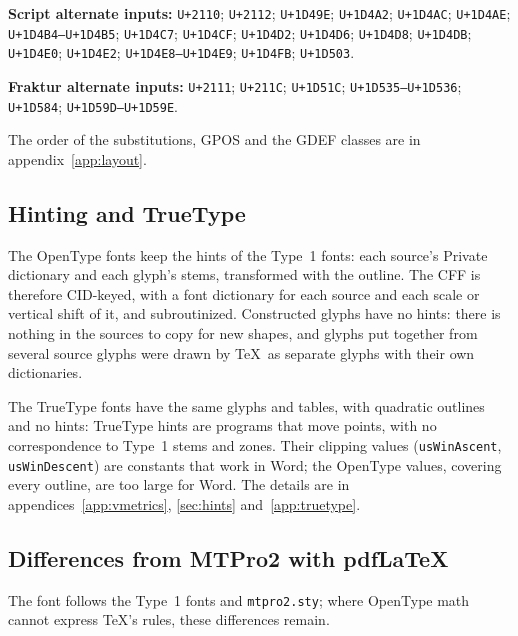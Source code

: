 \documentclass[10pt]{article}
\newcommand\file[1]{\texttt{#1}}
\newcommand\code[1]{\texttt{#1}}
\begin{document}
\begingroup\raggedright\textbf{Script alternate inputs:} \texttt{U+2110};
\texttt{U+2112}; \texttt{U+1D49E}; \texttt{U+1D4A2}; \texttt{U+1D4AC};
\texttt{U+1D4AE}; \texttt{U+1D4B4--U+1D4B5}; \texttt{U+1D4C7};
\texttt{U+1D4CF}; \texttt{U+1D4D2}; \texttt{U+1D4D6}; \texttt{U+1D4D8};
\texttt{U+1D4DB}; \texttt{U+1D4E0}; \texttt{U+1D4E2};
\texttt{U+1D4E8--U+1D4E9}; \texttt{U+1D4FB}; \texttt{U+1D503}.\par\endgroup

\begingroup\raggedright\textbf{Fraktur alternate inputs:} \texttt{U+2111};
\texttt{U+211C}; \texttt{U+1D51C}; \texttt{U+1D535--U+1D536}; \texttt{U+1D584};
\texttt{U+1D59D--U+1D59E}.\par\endgroup


The order of the substitutions, GPOS and the GDEF classes are in
appendix~\ref{app:layout}.

\subsection{Hinting and TrueType}

The OpenType fonts keep the hints of the Type~1 fonts: each source's
Private dictionary and each glyph's stems, transformed with the outline.
The CFF is therefore CID-keyed, with a font dictionary for each source
and each scale or vertical shift of it, and subroutinized.  Constructed
glyphs have no hints: there is nothing in the sources to copy for new
shapes, and glyphs put together from several source glyphs were drawn
by \TeX\ as separate glyphs with their own dictionaries.

The TrueType fonts have the same glyphs and tables, with quadratic
outlines and no hints: TrueType hints are programs that move points,
with no correspondence to Type~1 stems and zones.  Their clipping
values (\code{usWinAscent}, \code{usWinDescent}) are constants that work
in Word; the OpenType values, covering every outline, are too large for
Word.  The details are in appendices~\ref{app:vmetrics},
\ref{sec:hints} and~\ref{app:truetype}.

\subsection{Differences from MTPro2 with pdf\LaTeX}\label{sec:differences}

The font follows the Type~1 fonts and \file{mtpro2.sty}; where
OpenType math cannot express \TeX's rules, these differences remain.
\end{document}
